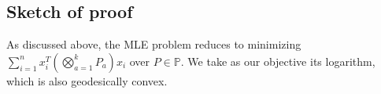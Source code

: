 \documentclass[aos]{imsart}
\theoremstyle{definition}
\numberwithin{equation}{section}
\DeclareMathOperator{\PD}{PD}
\renewcommand{\P}{{\mathbb{P}}}
\newcommand{\SL}{\operatorname{SL}}
\newcommand{\Sym}{\mathcal{S}}
\newcommand{\smallSym}{S}
\newcommand{\SPD}{\mathcal{P}}
\newcommand{\CF}[1]{{\color{purple}[CF: #1]}}
\newcommand{\MW}[1]{{\color{red}[MW: #1]}}
\begin{document}



\subsection{Sketch of proof}\label{subsec:proof-sketch}
As discussed above, the MLE problem reduces to minimizing $\sum_{i=1}^n x_i^T ( \bigotimes_{a=1}^k P_a ) x_i$ over $P \in \P$.
We take as our objective its logarithm, which is also geodesically convex.
\end{document}
